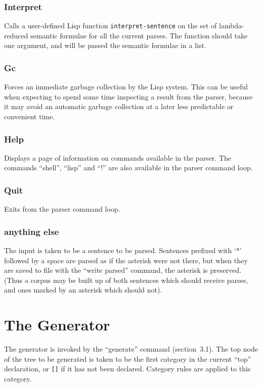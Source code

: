 \subsection{Interpret}

Calls a user-defined Lisp function {\tt interpret-sentence} on
the set of lambda-reduced semantic formulae for all the current parses.
The function should take one argument, and will be passed the semantic
formulae in a list.

\subsection{Gc}

Forces an immediate garbage collection by the Lisp system. This can be
useful when expecting to spend some time inspecting a result from the parser,
because it may avoid an automatic garbage collection at a later less
predictable or convenient time.

\subsection{Help}

Displays a page of information on commands available in the parser.
The commands ``shell'', ``lisp'' and ``!'' are also available in the parser
command loop.

\subsection{Quit}

Exits from the parser command loop.

\subsection{anything else}

The input is taken to be a sentence to be parsed. Sentences prefixed
with `*' followed by a space are parsed as if the asterisk were
not there, but when they are saved to file with the ``write parsed'' command, the
asterisk is preserved. (Thus a corpus may be built up of both sentences
which should receive parses, and ones marked by an asterisk which should not).


\chapter{The Generator}

The generator is invoked by the ``generate'' command (section~3.1). The top
node of the tree to be generated is taken to be the first category
in the current ``top'' declaration, or {\tt []} if it has not been declared.
Category rules are applied to this category.

